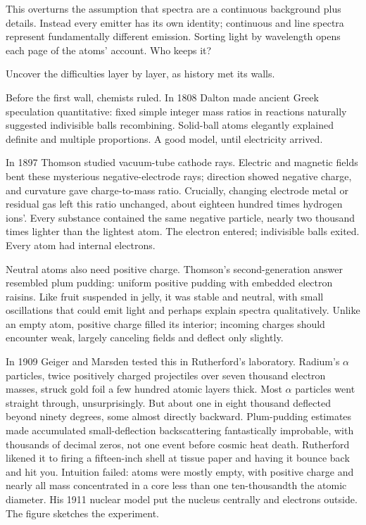\begin{mainline}
This overturns the assumption that spectra are a continuous background plus details. Instead every emitter has its own identity; continuous and line spectra represent fundamentally different emission. Sorting light by wavelength opens each page of the atoms' account. Who keeps it?
\end{mainline}


\begin{mainline}
Uncover the difficulties layer by layer, as history met its walls.

Before the first wall, chemists ruled. In 1808 Dalton made ancient Greek speculation quantitative: fixed simple integer mass ratios in reactions naturally suggested indivisible balls recombining. Solid-ball atoms elegantly explained definite and multiple proportions. A good model, until electricity arrived.

In 1897 Thomson studied vacuum-tube cathode rays. Electric and magnetic fields bent these mysterious negative-electrode rays; direction showed negative charge, and curvature gave charge-to-mass ratio. Crucially, changing electrode metal or residual gas left this ratio unchanged, about eighteen hundred times hydrogen ions'. Every substance contained the same negative particle, nearly two thousand times lighter than the lightest atom. The electron entered; indivisible balls exited. Every atom had internal electrons.

Neutral atoms also need positive charge. Thomson's second-generation answer resembled plum pudding: uniform positive pudding with embedded electron raisins. Like fruit suspended in jelly, it was stable and neutral, with small oscillations that could emit light and perhaps explain spectra qualitatively. Unlike an empty atom, positive charge filled its interior; incoming charges should encounter weak, largely canceling fields and deflect only slightly.

In 1909 Geiger and Marsden tested this in Rutherford's laboratory. Radium's \(\alpha\) particles, twice positively charged projectiles over seven thousand electron masses, struck gold foil a few hundred atomic layers thick. Most \(\alpha\) particles went straight through, unsurprisingly. But about one in eight thousand deflected beyond ninety degrees, some almost directly backward. Plum-pudding estimates made accumulated small-deflection backscattering fantastically improbable, with thousands of decimal zeros, not one event before cosmic heat death. Rutherford likened it to firing a fifteen-inch shell at tissue paper and having it bounce back and hit you. Intuition failed: atoms were mostly empty, with positive charge and nearly all mass concentrated in a core less than one ten-thousandth the atomic diameter. His 1911 nuclear model put the nucleus centrally and electrons outside. The figure sketches the experiment.
\end{mainline}

